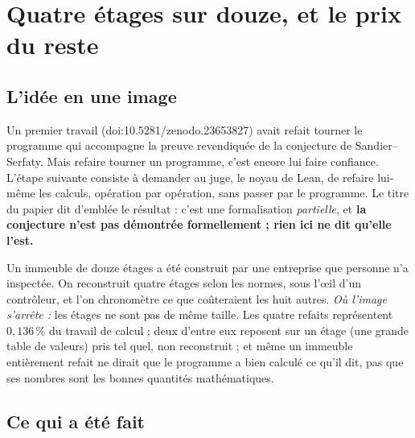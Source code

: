 \chapter[Quatre étages sur douze]{Quatre étages sur douze, et le prix du reste}


\section*{L'idée en une image}

Un premier travail (doi:10.5281/\allowbreak zenodo.23653827) avait refait tourner le programme qui accompagne la preuve revendiquée
de la conjecture de Sandier--Serfaty. Mais refaire tourner un programme, c'est encore lui faire
confiance. L'étape suivante consiste à demander au juge, le noyau de Lean, de refaire lui-même
les calculs, opération par opération, sans passer par le programme. Le titre du papier dit
d'emblée le résultat : c'est une formalisation \emph{partielle}, et \textbf{la conjecture n'est pas
démontrée formellement ; rien ici ne dit qu'elle l'est.}

\begin{analogie}
Un immeuble de douze étages a été construit par une entreprise que personne n'a inspectée. On
reconstruit quatre étages selon les normes, sous l'œil d'un contrôleur, et l'on chronomètre ce
que coûteraient les huit autres. \emph{Où l'image s'arrête :} les étages ne sont pas de même
taille. Les quatre refaits représentent $0{,}136\,\%$ du travail de calcul ; deux d'entre eux
reposent sur un étage (une grande table de valeurs) pris tel quel, non reconstruit ; et même un
immeuble entièrement refait ne dirait que \og le programme a bien calculé ce qu'il dit\fg{}, pas
que ses nombres sont les bonnes quantités mathématiques.
\end{analogie}

\section*{Ce qui a été fait}

